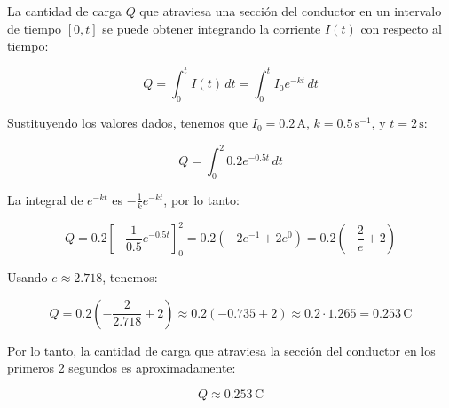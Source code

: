 \documentclass[answers]{exam} %
\begin{document}
\begin{questions}
	La cantidad de carga \(Q\) que atraviesa una sección del conductor en un intervalo de tiempo \([0, t]\) se puede obtener integrando la corriente \(I(t)\) con respecto al tiempo:

	\[
		\boxed{Q = \int_0^t I(t) \, dt = \int_0^t I_0 e^{-kt} \, dt}
	\]

	Sustituyendo los valores dados, tenemos que \(I_0 = 0.2 \, \text{A}\), \(k = 0.5 \, \text{s}^{-1}\), y \(t = 2 \, \text{s}\):

	\[
		Q = \int_0^2 0.2 e^{-0.5 t} \, dt
	\]

	La integral de \(e^{-kt}\) es \(-\frac{1}{k} e^{-kt}\), por lo tanto:

	\[
		Q = 0.2 \left[ -\frac{1}{0.5} e^{-0.5 t} \right]_0^2  =  0.2 \left( -2 e^{-1} + 2 e^0 \right) = 0.2 \left( -\frac{2}{e} + 2 \right)
	\]

	Usando \(e \approx 2.718\), tenemos:

	\[
		Q = 0.2 \left( -\frac{2}{2.718} + 2 \right) \approx 0.2 \left( -0.735 + 2 \right) \approx 0.2 \cdot 1.265 = 0.253 \, \text{C}
	\]

	Por lo tanto, la cantidad de carga que atraviesa la sección del conductor en los primeros 2 segundos es aproximadamente:

	\[
		Q \approx 0.253 \, \text{C}
	\]

	\begin{figure}[h]
		\centering

	\end{figure}



\end{questions}
\end{document}
